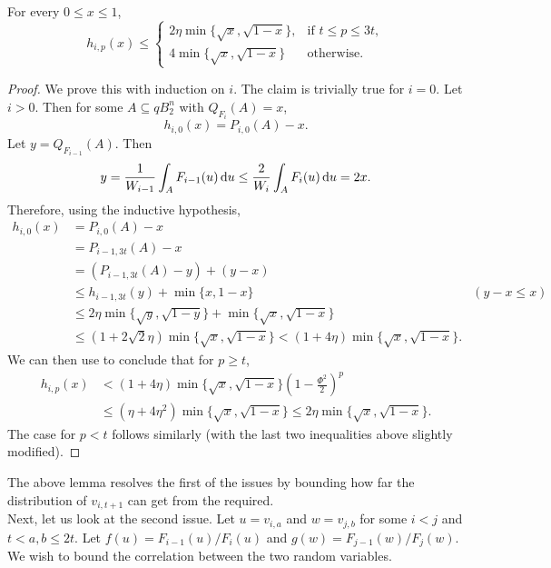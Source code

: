 \begin{lemma}
	\label{analysis lemma 1}
	For every $0\leq x\leq 1$,%
	\[
		h_{i,p}(x) \leq
		\begin{cases}
			2\eta\min\{\sqrt{x},\sqrt{1-x}\}, & \text{if } t\leq p\leq 3t, \\
			4\min\{\sqrt{x},\sqrt{1-x}\} & \text{otherwise.}
		\end{cases}
	\]
\end{lemma}
\begin{proof}
	We prove this with induction on $i$. The claim is trivially true for $i=0$. Let $i>0$. Then for some $A\subseteq qB_2^n$ with $Q_{F_i}(A)=x$,
	\[ h_{i,0}(x) = P_{i,0}(A) - x. \]
	Let $y=Q_{F_{i-1}}(A)$. Then
	\[ y = \frac{1}{W_{i-1}} \int_{A} F_{i-1}(u)\operatorname{d}\!{u} \leq \frac{2}{W_i}\int_{A} F_i(u)\operatorname{d}\!{u} = 2x. \]
	Therefore, using the inductive hypothesis,
	\begin{align*}
		h_{i,0}(x) &= P_{i,0}(A) - x \\
			&= P_{i-1,3t}(A) - x \\
			&= (P_{i-1,3t}(A) - y) + (y-x) \\
			&\leq h_{i-1,3t}(y) + \min\{x,1-x\} & (y-x\leq x) \\
			&\leq 2\eta\min\{\sqrt{y},\sqrt{1-y}\} + \min\{\sqrt{x},\sqrt{1-x}\} \\
			&\leq (1+2\sqrt{2}\eta) \min\{\sqrt{x},\sqrt{1-x}\} < (1+4\eta)\min\{\sqrt{x},\sqrt{1-x}\}.
	\end{align*}
	We can then use  to conclude that for $p\geq t$,
	\begin{align*}
		h_{i,p}(x) &< (1+4\eta) \min\{\sqrt{x},\sqrt{1-x}\}\left(1-\frac{\Phi^2}{2}\right)^p \\
			&\leq (\eta+4\eta^2) \min\{\sqrt{x},\sqrt{1-x}\} \leq 2\eta \min\{\sqrt{x},\sqrt{1-x}\}.
	\end{align*}
	The case for $p<t$ follows similarly (with the last two inequalities above slightly modified).
\end{proof}

The above lemma resolves the first of the issues by bounding how far the distribution of $v_{i,t+1}$ can get from the required.\\

Next, let us look at the second issue. Let $u=v_{i,a}$ and $w=v_{j,b}$ for some $i<j$ and $t<a,b\leq 2t$. Let $f(u)=F_{i-1}(u)/F_i(u)$ and $g(w)=F_{j-1}(w)/F_j(w)$. We wish to bound the correlation between the two random variables.

